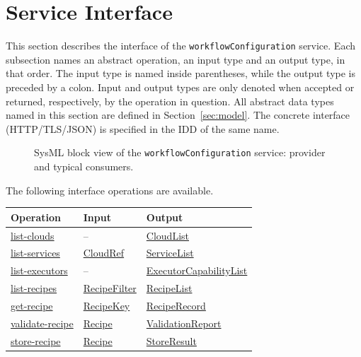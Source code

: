 \documentclass[a4paper]{arrowhead}
\newcommand{\mref}[1]{{\textcolor{ArrowheadPurple}{\hyperref[sec:model:#1]{#1}}}}
\newcommand{\oref}[1]{{\textcolor{ArrowheadBlue}{\hyperref[sec:operations:#1]{#1}}}}
\begin{document}
\newpage
\section{Service Interface}
\label{sec:operations}
This section describes the interface of the \texttt{workflowConfiguration} service. Each subsection names an abstract operation,
an input type and an output type, in that order. The input type is named inside parentheses, while the output type is
preceded by a colon. Input and output types are only denoted when accepted or returned, respectively, by the operation
in question. All abstract data types named in this section are defined in Section~\ref{sec:model}. The concrete
interface (HTTP/TLS/JSON) is specified in the IDD of the same name.

\begin{figure}[ht!]
  \centering
  \caption{SysML block view of the \texttt{workflowConfiguration} service: provider and typical consumers.}
  \label{fig:SD}
\end{figure}

The following interface operations are available.

{\small
\begin{longtable}{|p{4.4cm}|p{5.6cm}|p{5.8cm}|}

\hline
\rowcolor{gray!33} Operation & Input & Output \\ \hline
\endhead
\oref{list-clouds} & -- & \mref{CloudList} \\ \hline
\oref{list-services} & \mref{CloudRef} & \mref{ServiceList} \\ \hline
\oref{list-executors} & -- & \mref{ExecutorCapabilityList} \\ \hline
\oref{list-recipes} & \mref{RecipeFilter} & \mref{RecipeList} \\ \hline
\oref{get-recipe} & \mref{RecipeKey} & \mref{RecipeRecord} \\ \hline
\oref{validate-recipe} & \mref{Recipe} & \mref{ValidationReport} \\ \hline
\oref{store-recipe} & \mref{Recipe} & \mref{StoreResult} \\ \hline
\end{longtable}
}
\end{document}
